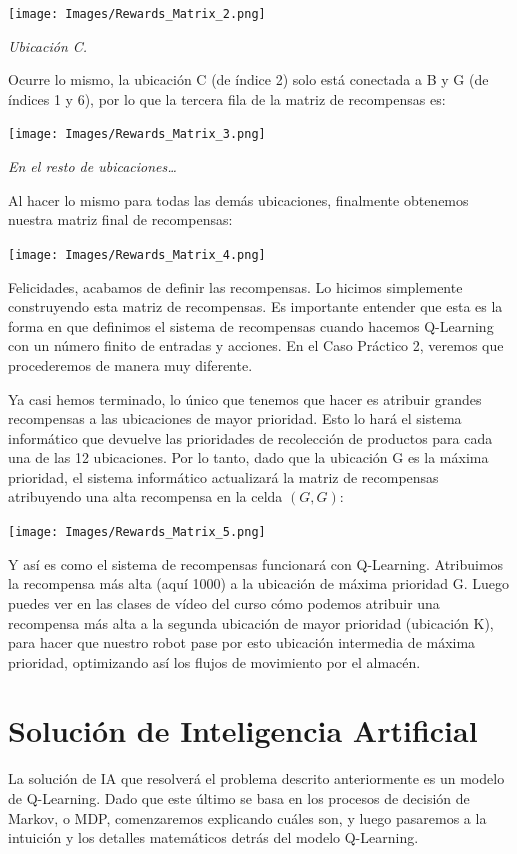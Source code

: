 \documentclass[
]{book}
\begin{document}
\texttt{[image: Images/Rewards\_Matrix\_2.png]}

\emph{Ubicación C.}

Ocurre lo mismo, la ubicación C (de índice 2) solo está conectada a B y G (de índices 1 y 6), por lo que la tercera fila de la matriz de recompensas es:

\texttt{[image: Images/Rewards\_Matrix\_3.png]}

\emph{En el resto de ubicaciones\ldots{}}

Al hacer lo mismo para todas las demás ubicaciones, finalmente obtenemos nuestra matriz final de recompensas:

\texttt{[image: Images/Rewards\_Matrix\_4.png]}

Felicidades, acabamos de definir las recompensas. Lo hicimos simplemente construyendo esta matriz de recompensas. Es importante entender que esta es la forma en que definimos el sistema de recompensas cuando hacemos Q-Learning con un número finito de entradas y acciones. En el Caso Práctico 2, veremos que procederemos de manera muy diferente.

Ya casi hemos terminado, lo único que tenemos que hacer es atribuir grandes recompensas a las ubicaciones de mayor prioridad. Esto lo hará el sistema informático que devuelve las prioridades de recolección de productos para cada una de las 12 ubicaciones. Por lo tanto, dado que la ubicación G es la máxima prioridad, el sistema informático actualizará la matriz de recompensas atribuyendo una alta recompensa en la celda \((G, G)\):

\texttt{[image: Images/Rewards\_Matrix\_5.png]}

Y así es como el sistema de recompensas funcionará con Q-Learning. Atribuimos la recompensa más alta (aquí 1000) a la ubicación de máxima prioridad G. Luego puedes ver en las clases de vídeo del curso cómo podemos atribuir una recompensa más alta a la segunda ubicación de mayor prioridad (ubicación K), para hacer que nuestro robot pase por esto ubicación intermedia de máxima prioridad, optimizando así los flujos de movimiento por el almacén.

\hypertarget{soluciuxf3n-de-inteligencia-artificial}{%
\section{Solución de Inteligencia Artificial}\label{soluciuxf3n-de-inteligencia-artificial}}

La solución de IA que resolverá el problema descrito anteriormente es un modelo de Q-Learning. Dado que este último se basa en los procesos de decisión de Markov, o MDP, comenzaremos explicando cuáles son, y luego pasaremos a la intuición y los detalles matemáticos detrás del modelo Q-Learning.
\end{document}
